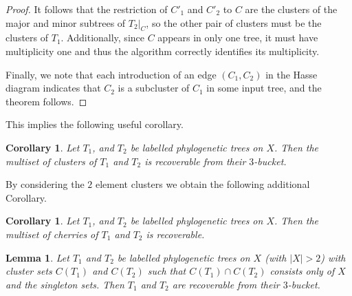 \documentclass[12pt]{article}
\newtheorem{Lemma}[Theorem]{Lemma}
\newtheorem{Corollary}[Theorem]{Corollary}
\theoremstyle{definition}
\begin{document}
\begin{proof}
  
  
  It follows that the restriction of $C'_1$ and $C'_2$ to $C$ are the clusters of the major and minor subtrees of $T_2|_C$, so the other pair of clusters must be the clusters of $T_1$. Additionally, since $C$ appears in only one tree, it must have multiplicity one and thus the algorithm correctly identifies its multiplicity. 

  Finally, we note that each introduction of an edge $(C_1,C_2)$ in the Hasse diagram indicates that $C_2$ is a subcluster of $C_1$ in some input tree, and the theorem follows.  
\end{proof}

This implies the following useful corollary. 

\begin{Corollary}\label{labelled_triples_same_clusters}
    Let $T_1$, and $T_2$ be labelled phylogenetic trees on $X$. Then the multiset of clusters of $T_1$ and $T_2$ is recoverable from their $3$-bucket.
\end{Corollary}

By considering the $2$ element clusters we obtain the following additional Corollary.

\begin{Corollary}\label{labelled_triples_same_cherries}
    Let $T_1$, and $T_2$ be labelled phylogenetic trees on $X$. Then the multiset of cherries of $T_1$ and $T_2$ is recoverable.
\end{Corollary}


\begin{Lemma}\label{l:split.clusterset}
    Let $T_1$ and $T_2$ be labelled phylogenetic trees on $X$ (with $|X|>2$) with cluster sets $C(T_1)$ and $C(T_2)$ such that $C(T_1) \cap C(T_2)$ consists only of $X$ and the singleton sets. Then $T_1$ and $T_2$ are recoverable from their $3$-bucket. 
\end{Lemma}
\end{document}
